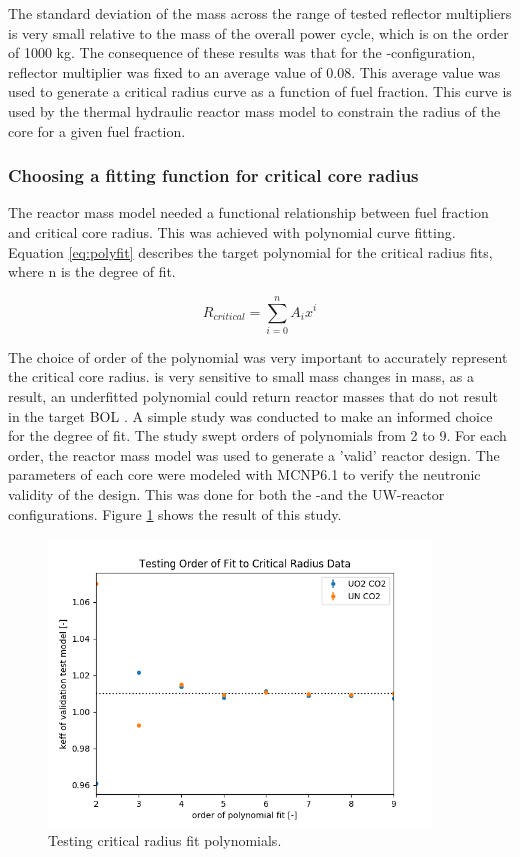 The standard deviation of the mass across the range of tested reflector
multipliers is very small relative to the mass of the overall power cycle,
which is on the order of 1000 kg. The consequence of these results was that for the \uox-\codiox configuration, reflector multiplier was fixed to an
average value of 0.08. This average value was used to generate a critical radius
curve as a function of fuel fraction. This curve is used by the thermal
hydraulic reactor mass model to constrain the radius of the core for a given
fuel fraction. 


\subsubsection{Choosing a fitting function for critical core radius}
The reactor mass model needed a functional relationship between fuel fraction
and critical core radius. This was achieved with polynomial curve fitting.
Equation \ref{eq:polyfit} describes the target polynomial for the critical
radius fits, where n is the degree of fit.

\begin{equation}
    R_{critical} = \sum_{i=0}^n A_ix^i
    \label{eq:polyfit}
\end{equation}

The choice of order of the polynomial was very important to accurately represent the
critical core radius. \keff is very sensitive to small mass changes in mass, as
a result, an underfitted polynomial could return reactor masses that do not
result in the target BOL \keff. A simple study was conducted to make an informed
choice for the degree of fit. The study swept orders of polynomials from 2 to 9.
For each order, the reactor mass model was used to generate a 'valid' reactor
design. The parameters of each core were modeled with MCNP6.1 to verify the
neutronic validity of the design. This was done for both the \uox-\codiox and
the UW-\codiox reactor configurations. Figure \ref{fig:fit_order_test} shows the
result of this study.

\begin{figure}[h]
    \centering
    \includegraphics[width=4in]{../images/poly_order_test.png}
\caption{Testing critical radius fit polynomials.}
\label{fig:fit_order_test}
\end{figure}

